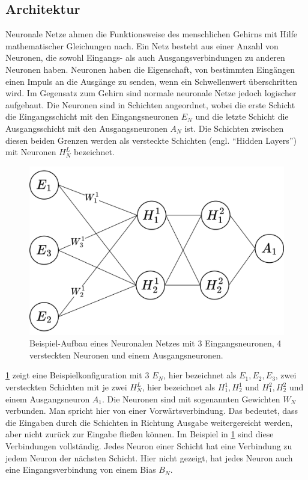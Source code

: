 \subsection{Architektur}
Neuronale Netze ahmen die Funktionsweise des menschlichen Gehirns mit Hilfe mathematischer Gleichungen nach.
Ein Netz besteht aus einer Anzahl von Neuronen, die sowohl Eingangs- als auch Ausgangsverbindungen zu anderen Neuronen haben.
Neuronen haben die Eigenschaft, von bestimmten Eingängen einen Impuls an die Ausgänge zu senden, wenn ein Schwellenwert überschritten wird.
Im Gegensatz zum Gehirn sind normale neuronale Netze jedoch logischer aufgebaut.
Die Neuronen sind in Schichten angeordnet, wobei die erste Schicht die Eingangsschicht mit den Eingangsneuronen $E_N$ und die letzte Schicht die Ausgangsschicht mit den Ausgangsneuronen $A_N$ ist.
Die Schichten zwischen diesen beiden Grenzen werden als versteckte Schichten (engl. \enquote{Hidden Layers}) mit Neuronen $H^L_N$ bezeichnet.\\

\begin{figure}
    \centering
    \includegraphics[width=\textwidth]{zeichnungen/nn.png}
    \caption{Beispiel-Aufbau eines Neuronalen Netzes mit 3 Eingangsneuronen, 4 versteckten Neuronen und einem Ausgangsneuronen.}\label{nn_simple}
\end{figure}

\cref{nn_simple} zeigt eine Beispielkonfiguration mit 3 $E_N$, hier bezeichnet als $E_1,E_2,E_3$, zwei versteckten Schichten mit je zwei $H^L_N$, hier bezeichnet als $H^1_1, H^1_2$ und $H^2_1, H^2_2$ und einem Ausgangsneuron $A_1$.
Die Neuronen sind mit sogenannten Gewichten $W_N$ verbunden. Man spricht hier von einer Vorwärtsverbindung.
Das bedeutet, dass die Eingaben durch die Schichten in Richtung Ausgabe weitergereicht werden, aber nicht zurück zur Eingabe fließen können.
Im Beispiel in \cref{nn_simple} sind diese Verbindungen vollständig.
Jedes Neuron einer Schicht hat eine Verbindung zu jedem Neuron der nächsten Schicht.
Hier nicht gezeigt, hat jedes Neuron auch eine Eingangsverbindung von einem Bias $B_N$.

